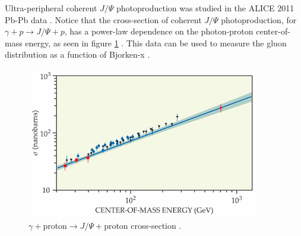 Ultra-peripheral coherent $J/\Psi$ photoproduction was studied in the ALICE 2011 Pb-Pb data \cite{Abelev:2012ba}. Notice that the cross-section of coherent $J/\Psi$ photoproduction, for $\gamma+p\rightarrow J/\Psi+p$, has a power-law dependence on the photon-proton center-of-mass energy, as seen in figure \ref{fig:aliceData1} \cite{Klein:2017nqo}. This data can be used to measure the gluon distribution as a function of Bjorken-x \cite{pQCD2011.08}. 
\begin{figure}[h!]
\begin{centering}
\includegraphics[width=4in]{Chapter2/importfigs/aliceData1.jpeg}
\par\end{centering}
\caption{$\gamma +$proton$\rightarrow J/\Psi +$proton cross-section \cite{Klein:2017nqo}. \label{fig:aliceData1}}
\end{figure}

